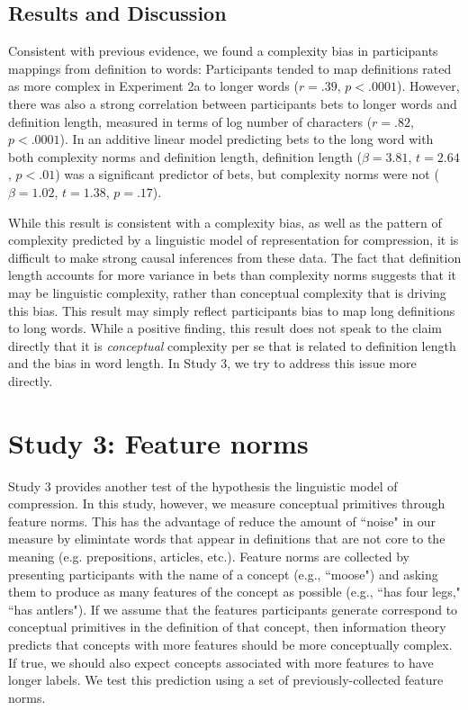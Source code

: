 \subsection{Results and Discussion}
Consistent with previous evidence, we found a complexity bias in participants mappings from definition to words: Participants tended to map definitions rated as more complex in Experiment 2a to longer words ($r = .39$,  $p< .0001$). However, there was also a strong correlation between participants bets to longer words and definition length, measured in terms of log number of characters ($r = .82$, $p< .0001$). In an additive linear model predicting bets to the long word with both complexity norms and definition length, definition length ($\beta=3.81$, $t =2.64$, $p<.01$) was a significant predictor of bets, but complexity norms were not ($\beta=1.02$, $t =1.38$, $p=.17$). 

While this result is consistent with a complexity bias, as well as the pattern of complexity predicted by a linguistic model of representation for compression, it is difficult to make strong causal inferences from these data. The fact that definition length accounts for more variance in bets than complexity norms suggests that it may be linguistic complexity, rather than conceptual complexity that is driving this bias. This result may simply reflect participants bias to map long definitions to long words. While a positive finding, this result does not speak to the claim directly that it is {\it conceptual} complexity per se that is related to definition length and the bias in word length. In Study 3, we try to address this issue more directly. 

\section{Study 3: Feature norms}
Study 3 provides another test of the hypothesis the linguistic model of compression. In this study, however, we measure conceptual primitives through feature norms. This has the advantage of reduce the amount of ``noise" in our measure by elimintate words that appear in definitions that are not core to the meaning (e.g. prepositions, articles, etc.). Feature norms are collected by presenting participants with the name of a concept (e.g., ``moose") and asking them to produce as many features of the concept as possible (e.g., ``has four legs," ``has antlers"). If we assume that the features participants generate correspond to conceptual primitives in the definition of that concept, then information theory predicts that concepts with more  features should be more conceptually complex. If true, we should also expect concepts associated with more features to have longer labels. We test this prediction using a set of previously-collected feature norms.


